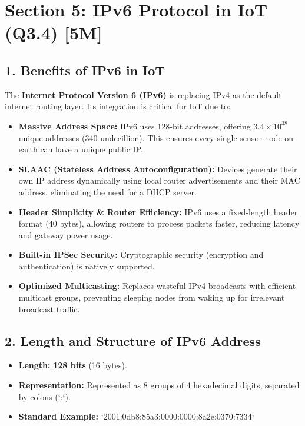 \section{Section 5: IPv6 Protocol in IoT (Q3.4) [5M]}

\subsection{1. Benefits of IPv6 in IoT}
The \textbf{Internet Protocol Version 6 (IPv6)} is replacing IPv4 as the default internet routing layer. Its integration is critical for IoT due to:
\begin{itemize}
  \item   \textbf{Massive Address Space:} IPv6 uses 128-bit addresses, offering $3.4 \times 10^{38}$ unique addresses ($340\text{ undecillion}$). This ensures every single sensor node on earth can have a unique public IP.
  \item   \textbf{SLAAC (Stateless Address Autoconfiguration):} Devices generate their own IP address dynamically using local router advertisements and their MAC address, eliminating the need for a DHCP server.
  \item   \textbf{Header Simplicity \& Router Efficiency:} IPv6 uses a fixed-length header format (40 bytes), allowing routers to process packets faster, reducing latency and gateway power usage.
  \item   \textbf{Built-in IPSec Security:} Cryptographic security (encryption and authentication) is natively supported.
  \item   \textbf{Optimized Multicasting:} Replaces wasteful IPv4 broadcasts with efficient multicast groups, preventing sleeping nodes from waking up for irrelevant broadcast traffic.
\end{itemize}


\subsection{2. Length and Structure of IPv6 Address}
\begin{itemize}
  \item   \textbf{Length:} \textbf{128 bits} (16 bytes).
  \item   \textbf{Representation:} Represented as 8 groups of 4 hexadecimal digits, separated by colons (`:`).
  \item   \textbf{Standard Example:} `2001:0db8:85a3:0000:0000:8a2e:0370:7334`
\end{itemize}

